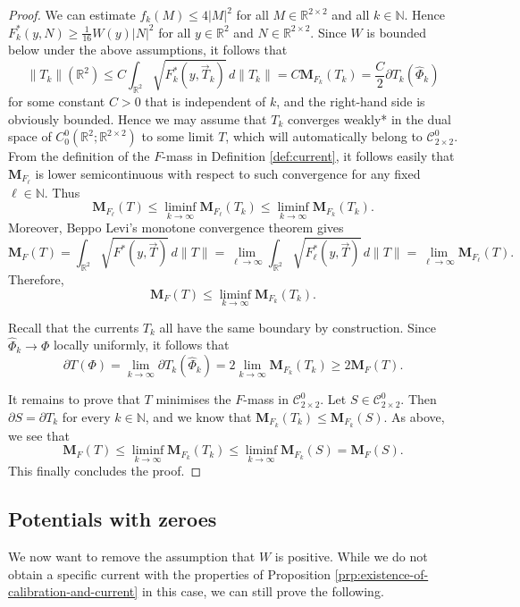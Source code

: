 \documentclass[a4paper]{article}
\newcommand{\R}{\mathbb{R}}
\newcommand{\N}{\mathbb{N}}
\newcommand{\M}{\mathbf{M}}
\newcommand{\ncrt}{\mathcal{C}}
\theoremstyle{definition}
\theoremstyle{remark}
\begin{document}
\begin{proof}
We can estimate $f_k(M) \le 4|M|^2$ for all $M \in \R^{2 \times 2}$ and all $k \in \N$.
Hence $F_k^*(y, N) \ge \frac{1}{16} W(y) |N|^2$ for all $y \in \R^2$
and $N \in \R^{2 \times 2}$. Since $W$ is bounded below under the above assumptions,
it follows that
\[
\|T_k\|(\R^2) \le C\int_{\R^2} \sqrt{F_k^*(y, \vec{T}_k)} \, d\|T_k\| = C\M_{F_k}(T_k) = \frac{C}{2} \partial T_k(\hat{\Phi}_k)
\]
for some constant $C > 0$ that is independent of $k$, and the right-hand side is obviously
bounded. Hence we may assume that $T_k$ converges
weakly* in the dual space of $C_0^0(\R^2; \R^{2 \times 2})$ to some
limit $T$, which will automatically belong to $\ncrt_{2 \times 2}^0$.
From the definition of the $F$-mass in Definition \ref{def:current}, it follows easily that $\M_{F_\ell}$
is lower semicontinuous with respect to such convergence for any
fixed $\ell \in \N$. Thus
\[
\M_{F_\ell}(T) \le \liminf_{k \to \infty} \M_{F_\ell}(T_k) \le \liminf_{k \to \infty} \M_{F_k}(T_k).
\]
Moreover, Beppo Levi's monotone convergence theorem gives
\[
\M_F(T) = \int_{\R^2} \sqrt{F^*(y, \vec{T})} \, d\|T\| = \lim_{\ell \to \infty} \int_{\R^2} \sqrt{F_\ell^*(y, \vec{T})} \, d\|T\| = \lim_{\ell \to \infty} \M_{F_\ell}(T).
\]
Therefore,
\[
\M_F(T) \le \liminf_{k \to \infty} \M_{F_k}(T_k).
\]

Recall that the currents $T_k$ all have the same boundary by construction. Since $\hat{\Phi}_k \to \Phi$ locally uniformly, it follows that
\[
\partial T(\Phi) = \lim_{k \to \infty} \partial T_k(\hat{\Phi}_k) = 2\lim_{k \to \infty} \M_{F_k}(T_k) \ge 2\M_F(T).
\]

It remains to prove that $T$ minimises the $F$-mass in $\ncrt_{2 \times 2}^0$.
Let $S \in \ncrt_{2 \times 2}^0$. Then $\partial S = \partial T_k$ for every $k \in \N$, and we
know that $\M_{F_k}(T_k) \le \M_{F_k}(S)$. As above, we see that
\[
\M_F(T) \le \liminf_{k \to \infty} \M_{F_k}(T_k) \le \liminf_{k \to \infty} \M_{F_k}(S) = \M_F(S).
\]
This finally concludes the proof.
\end{proof}



\subsection{Potentials with zeroes}

We now want to remove the assumption that $W$ is positive. While we do not obtain
a specific current with the properties of Proposition \ref{prp:existence-of-calibration-and-current}
in this case, we can still prove the following.
\end{document}
